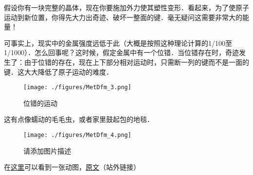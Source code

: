 假设你有一块完整的晶体，现在你要施加外力使其塑性变形．看起来，为了使原子运动到新位置，你得先大力出奇迹、破坏一整面的键．毫无疑问这需要非常大的能量！

可事实上，现实中的金属强度远低于此（大概是按照这种理论计算的1/100至1/1000）．怎么回事呢？这时候，假定金属中有一个位错．当位错存在时，奇迹发生了：由于位错的存在，现在上下部分相对运动时，只需断一列的键而不是一面的键．这大大降低了原子运动的难度．
\begin{figure}[ht]
\centering
\texttt{[image: ./figures/MetDfm\_3.png]}
\caption{位错的运动} \label{MetDfm_fig3}
\end{figure}
这有点像蠕动的毛毛虫，或者家里鼓起包的地毯．




\begin{figure}[ht]
\centering
\texttt{[image: ./figures/MetDfm\_4.png]}
\caption{请添加图片描述} \label{MetDfm_fig4}
\end{figure}
在\href{https://5b0988e595225.cdn.sohucs.com/q_70,c_zoom,w_640/images/20191101/b54fbd26dc14497d8607965e6b395c96.gif}{这里}可以看到一张动图，\href{https://m.sohu.com/a/350972084_120056486/}{原文}（站外链接）
